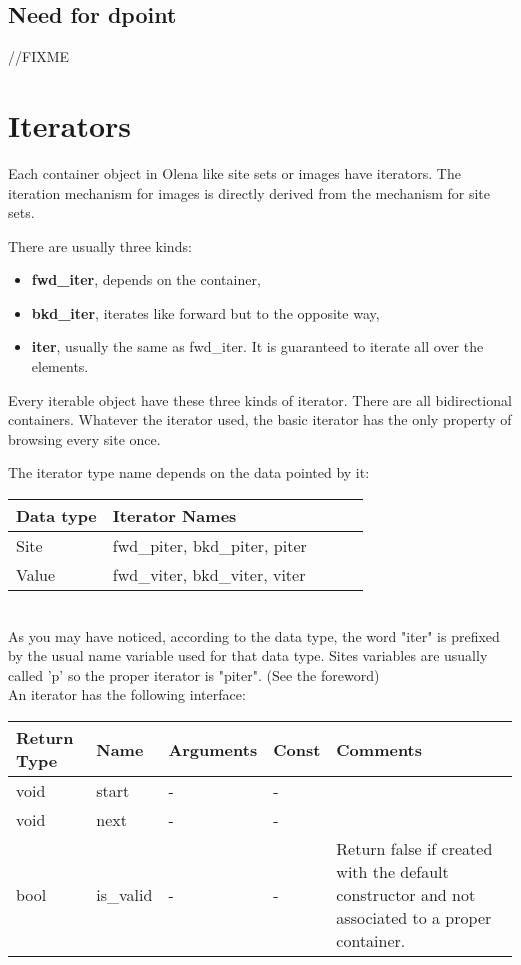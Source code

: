 \documentclass{report}
\begin{document}
\section{Need for dpoint}
//FIXME

\clearpage
\newpage
\chapter{Iterators}

Each container object in Olena like site sets or images have iterators.
The iteration mechanism for images is directly derived from the mechanism
for site sets.

There are usually three kinds:
\begin{itemize}
\item \textbf{fwd\_iter}, depends on the container,
\item \textbf{bkd\_iter}, iterates like forward but to the opposite way,
\item \textbf{iter}, usually the same as fwd\_iter. It is guaranteed to
iterate all over the elements.
\end{itemize}
Every iterable object have these three kinds of iterator. There are all
bidirectional containers.
Whatever the iterator used, the basic iterator has the only property of
browsing every site once.

The iterator type name depends on the data pointed by it: \\

\begin{tabular}{|l|l|l|l|p{4cm}|}
\hline
Data type & Iterator Names \\ \hline
Site & fwd\_piter, bkd\_piter, piter \\ \hline
Value & fwd\_viter, bkd\_viter, viter \\ \hline
\end{tabular} \\

As you may have noticed, according to the data type, the word "iter" is prefixed
by the usual name variable used for that data type. Sites variables are usually
called 'p' so the proper iterator is "piter". (See the foreword)\\


An iterator has the following interface: \\

\begin{tabular}{|l|l|l|l|p{4cm}|}
\hline
Return Type & Name & Arguments & Const & Comments \\ \hline

void & start & - & - & \\ \hline
void & next & - & - & \\ \hline
bool & is\_valid & - & - & Return false if created with the default
constructor and not associated to a proper container.\\ \hline
\end{tabular} \\
\end{document}
